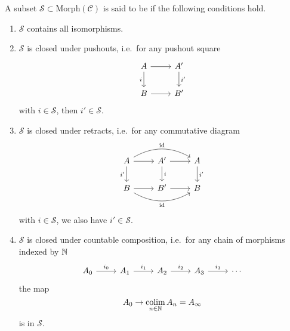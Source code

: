 \documentclass[main.tex]{subfiles}
\begin{document}
\begin{definition}[saturated]
  \label{def:saturated}
  A subset $\mathcal{S} \subset \mathrm{Morph}(\mathcal{C})$ is said to be  if the following conditions hold.
  \begin{enumerate}
    \item $\mathcal{S}$ contains all isomorphisms.

    \item $\mathcal{S}$ is closed under pushouts, i.e.\ for any pushout square
      \begin{equation*}
        \begin{tikzcd}
          A
          \arrow[r]
          \arrow[d, swap, "i"]
          & A'
          \arrow[d, "i'"]
          \\
          B
          \arrow[r]
          & B'
        \end{tikzcd}
      \end{equation*}
      with $i \in \mathcal{S}$, then $i' \in \mathcal{S}$.

    \item $\mathcal{S}$ is closed under retracts, i.e.\ for any commutative diagram
      \begin{equation*}
        \begin{tikzcd}
          A
          \arrow[rr, bend left, "\id"]
          \arrow[r]
          \arrow[d, swap, "i'"]
          & A'
          \arrow[r]
          \arrow[d, "i"]
          & A
          \arrow[d, "i'"]
          \\
          B
          \arrow[rr, bend right, swap, "\id"]
          \arrow[r]
          & B'
          \arrow[r]
          & B
        \end{tikzcd}
      \end{equation*}
      with $i \in \mathcal{S}$, we also have $i' \in \mathcal{S}$.

    \item $\mathcal{S}$ is closed under countable composition, i.e.\ for any chain of morphisms indexed by $\mathbb{N}$
      \begin{equation*}
        \begin{tikzcd}
          A_{0}
          \arrow[r, "i_{0}"]
          & A_{1}
          \arrow[r, "i_{1}"]
          & A_{2}
          \arrow[r, "i_{2}"]
          & A_{3}
          \arrow[r, "i_{3}"]
          & \cdots
        \end{tikzcd}
      \end{equation*}
      the map
      \begin{equation*}
        A_{0} \to \operatorname*{colim}_{n \in \mathbb{N}} A_{n} = A_{\infty}
      \end{equation*}
      is in $\mathcal{S}$.


\end{enumerate}
\end{definition}
\end{document}
